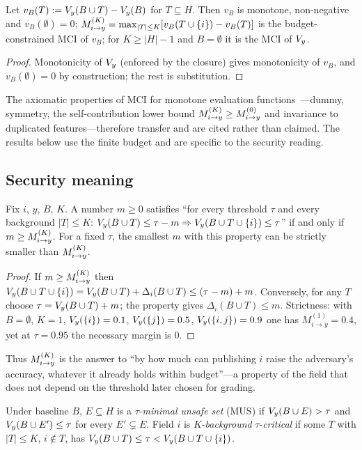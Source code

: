 \begin{proposition}\label{prop:mci}
Let $v_B(T) := V_{y}(B \cup T) - V_{y}(B)$ for $T \subseteq H$. Then $v_B$ is monotone,
non-negative and $v_B(\emptyset)=0$; $M^{(K)}_{i \to y} = \max_{|T|\le K}[v_B(T\cup\{i\}) - v_B(T)]$ is the
budget-constrained MCI of $v_B$; for $K \ge |H|-1$ and $B=\emptyset$ it is the MCI of $V_{y}$.
\end{proposition}
\begin{proof}
Monotonicity of $V_{y}$ (enforced by the closure) gives monotonicity of $v_B$, and
$v_B(\emptyset)=0$ by construction; the rest is substitution.
\end{proof}
The axiomatic properties of MCI for monotone evaluation functions~\cite{catav2021mci}---dummy,
symmetry, the self-contribution lower bound $M^{(K)}_{i \to y}\ge M^{(0)}_{i\to y}$ and invariance to
duplicated features---therefore transfer and are cited rather than claimed. The results below
use the finite budget and are specific to the security reading.

\subsection{Security meaning}
\begin{theorem}\label{thm:margin}
Fix $i$, $y$, $B$, $K$. A number $m\ge 0$ satisfies ``for every threshold $\tau$ and every
background $|T|\le K$: $V_{y}(B\cup T)\le\tau-m \Rightarrow V_{y}(B\cup T\cup\{i\})\le\tau$''
if and only if $m\ge M^{(K)}_{i \to y}$. For a fixed $\tau$, the smallest $m$ with this property can be
strictly smaller than $M^{(K)}_{i \to y}$.
\end{theorem}
\begin{proof}
If $m\ge M^{(K)}_{i \to y}$ then $V_{y}(B\cup T\cup\{i\})=V_{y}(B\cup T)+\Delta_i(B\cup T)\le(\tau-m)+m$.
Conversely, for any $T$ choose $\tau=V_{y}(B\cup T)+m$; the property gives $\Delta_i(B\cup T)\le
m$. Strictness: with $B=\emptyset$, $K=1$, $V_{y}(\{i\})=0.1$, $V_{y}(\{j\})=0.5$,
$V_{y}(\{i,j\})=0.9$ one has $M^{(1)}_{i\to y}=0.4$, yet at $\tau=0.95$ the necessary margin is $0$.
\end{proof}
Thus $M^{(K)}_{i \to y}$ is the answer to ``by how much can publishing $i$ raise the adversary's accuracy,
whatever it already holds within budget''---a property of the field that does not depend on
the threshold later chosen for grading.

\begin{definition}
Under baseline $B$, $E\subseteq H$ is a $\tau$-\emph{minimal unsafe set} (MUS) if
$V_{y}(B\cup E)>\tau$ and $V_{y}(B\cup E')\le\tau$ for every $E'\subsetneq E$. Field $i$ is
$K$-\emph{background} $\tau$-\emph{critical} if some $T$ with $|T|\le K$, $i\notin T$, has
$V_{y}(B\cup T)\le\tau<V_{y}(B\cup T\cup\{i\})$.
\end{definition}


